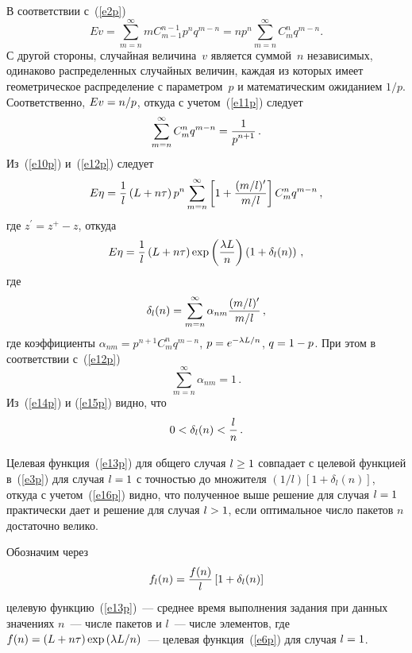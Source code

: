 \begin{multicols}{2}
В соответствии с~(\ref{e2p}) 
\begin{equation}
E v = \!\sum\limits_{m=n}^\infty m C_{m-1}^{n-1} p^n q^{m-n} =n p^n\! 
\sum\limits_{m=n}^\infty C_m^n q^{m-n}.
\label{e11p}
\end{equation}
С другой стороны, случайная величина~$v$ является суммой~$n$ 
независимых, одинаково распределенных случайных величин, каждая из 
которых имеет геометрическое распределение с параметром~$p$ и 
математическим ожиданием $1/p$. Соответственно, $Ev \hm= n/p$, откуда с 
учетом~(\ref{e11p}) следует 
\begin{equation}
\sum\limits_{m=n}^\infty C_m^n q^{m-n} =\displaystyle\frac{\displaystyle 1\mathstrut}{\displaystyle p^{n+1}\mathstrut}\,.
\label{e12p}
\end{equation}
Из~(\ref{e10p}) и~(\ref{e12p}) следует
$$
E\eta = \displaystyle\frac{\displaystyle 1\mathstrut}{\displaystyle l\mathstrut}\left( L+n\tau\right) p^n \sum\limits_{m=n}^\infty \left[ 
1+\displaystyle\frac{\displaystyle (m/l)^\prime\mathstrut}{\displaystyle m/l\mathstrut}\right] C_m^n q^{m-n}\,,
$$
где $z^\prime=z^+-z$, откуда
\begin{equation}
E\eta =\displaystyle\frac{\displaystyle 1\mathstrut}{\displaystyle l\mathstrut}\left(L+n\tau\right)\exp \left( \displaystyle\frac{\displaystyle \lambda L\mathstrut}{\displaystyle n\mathstrut}\right) 
\left(1+\delta_l(n)\right)\,,
\label{e13p}
\end{equation}
где 
\begin{equation}
\delta_l(n)=\sum\limits_{m=n}^\infty \alpha_{nm} \displaystyle\frac{\displaystyle (m/l)^\prime\mathstrut}{\displaystyle m/l\mathstrut}\,,
\label{e14p}
\end{equation}
где коэффициенты $\alpha_{nm} =p^{n+1} C_m^n q^{m-n}$, $p\hm= e^{-
\lambda L/n}$, $q\hm=1\hm-p$. При этом в соответствии с~(\ref{e12p}) 
\begin{equation}
\sum\limits_{m=n}^\infty \alpha_{nm}=1\,.
\label{e15p}
\end{equation}
Из~(\ref{e14p}) и (\ref{e15p}) видно, что 
\begin{equation}
0<\delta_l(n)<\displaystyle\frac{\displaystyle l\mathstrut}{\displaystyle n\mathstrut}\,.
\label{e16p}
\end{equation}
     
     Целевая функция~(\ref{e13p}) для общего случая $l\hm\geq 1$ 
совпадает с целевой функцией в~(\ref{e3p}) для случая $l\hm=1$ с точностью 
до множителя $(1/l)\left[ 1+\delta_l(n)\right]$, откуда с учетом~(\ref{e16p}) 
видно, что полученное выше решение для случая $l\hm=1$ практически дает 
и решение для случая $l\hm>1$, если оптимальное число пакетов $n$ 
достаточно велико.
     
     Обозначим через
     \begin{equation}
     f_l(n) =\displaystyle\frac{\displaystyle f(n)\mathstrut}{\displaystyle l\mathstrut}\left[ 1+\delta_l(n)\right]
     \label{e17p}
     \end{equation}
целевую функцию~(\ref{e13p})~--- среднее время выполнения задания при 
данных значениях $n$~--- чис\-ле пакетов и $l$~--- чис\-ле элементов, где 
$f(n)\hm=(L+n\tau)\exp\left(\lambda L/n\right)$~--- целевая функция~(\ref{e6p}) 
для случая $l\hm=1$.
     

\end{multicols}
